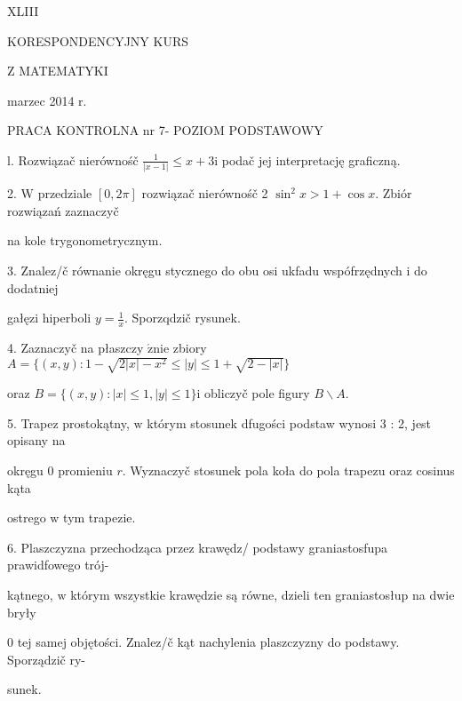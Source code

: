 \documentclass[a4paper,12pt]{article}
\begin{document}
XLIII

KORESPONDENCYJNY KURS

Z MATEMATYKI

marzec 2014 r.

PRACA KONTROLNA nr 7- POZIOM PODSTAWOWY

l. Rozwiązač nierównośč $\displaystyle \frac{1}{|x-1|}\leq x+3\mathrm{i}$ podač jej interpretację graficzną.

2. $\mathrm{W}$ przedziale $[0,2\pi]$ rozwiązač nierównośč 2 $\sin^{2}x>1+\cos x$. Zbiór rozwiązań zaznaczyč

na kole trygonometrycznym.

3. Znalez/č równanie okręgu stycznego do obu osi ukfadu wspófrzędnych $\mathrm{i}$ do dodatniej

gałęzi hiperboli $y=\displaystyle \frac{1}{x}$. Sporzqdzič rysunek.

4. Zaznaczyč na płaszczy $\acute{\mathrm{z}}\mathrm{n}\mathrm{i}\mathrm{e}$ zbiory $A = \{(x,y):1-\sqrt{2|x|-x^{2}}\leq|y|\leq 1+\sqrt{2-|x|}\}$

oraz $B=\{(x,y):|x|\leq 1,|y|\leq 1\}\mathrm{i}$ obliczyč pole figury $B\backslash A.$

5. Trapez prostokątny, $\mathrm{w}$ którym stosunek dfugości podstaw wynosi 3 : 2, jest opisany na

okręgu $0$ promieniu $r$. Wyznaczyč stosunek pola koła do pola trapezu oraz cosinus kąta

ostrego $\mathrm{w}$ tym trapezie.

6. Plaszczyzna przechodząca przez krawędz/ podstawy graniastosfupa prawidfowego trój-

kątnego, $\mathrm{w}$ którym wszystkie krawędzie są równe, dzieli ten graniastosłup na dwie bryły

$0$ tej samej objętości. Znalez/č kąt nachylenia plaszczyzny do podstawy. Sporządzič ry-

sunek.
\end{document}
